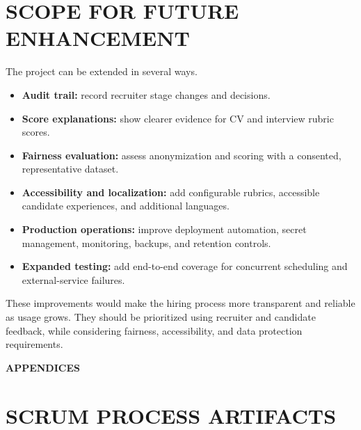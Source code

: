 \chapter{SCOPE FOR FUTURE ENHANCEMENT}
The project can be extended in several ways.
\begin{itemize}
\item \textbf{Audit trail:} record recruiter stage changes and decisions.
\item \textbf{Score explanations:} show clearer evidence for CV and interview rubric scores.
\item \textbf{Fairness evaluation:} assess anonymization and scoring with a consented, representative dataset.
\item \textbf{Accessibility and localization:} add configurable rubrics, accessible candidate experiences, and additional languages.
\item \textbf{Production operations:} improve deployment automation, secret management, monitoring, backups, and retention controls.
\item \textbf{Expanded testing:} add end-to-end coverage for concurrent scheduling and external-service failures.
\end{itemize}
These improvements would make the hiring process more transparent and reliable as usage grows. They should be prioritized using recruiter and candidate feedback, while considering fairness, accessibility, and data protection requirements.
%
%
%
%
\clearpage
{}
\appendix
\quad\vfill
\begin{center}
{\Huge \bf APPENDICES}
\end{center}
\vfill
\clearpage
%
%
%
%
\chapter{SCRUM PROCESS ARTIFACTS}
%
